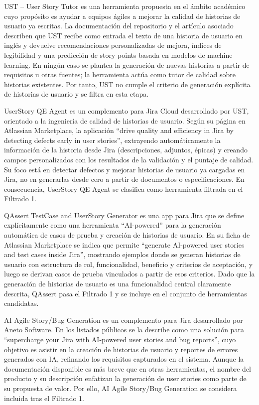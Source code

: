 UST – User Story Tutor \cite{ust} es una herramienta propuesta en el ámbito académico cuyo propósito es ayudar a equipos ágiles a mejorar la calidad de historias de usuario ya escritas. La documentación del repositorio y el artículo asociado describen que UST recibe como entrada el texto de una historia de usuario en inglés y devuelve recomendaciones personalizadas de mejora, índices de legibilidad y una predicción de story points basada en modelos de machine learning. En ningún caso se plantea la generación de nuevas historias a partir de requisitos u otras fuentes; la herramienta actúa como tutor de calidad sobre historias existentes. Por tanto, UST no cumple el criterio de generación explícita de historias de usuario y se filtra en esta etapa.

UserStory QE Agent \cite{userstoryqe} es un complemento para Jira Cloud desarrollado por UST, orientado a la ingeniería de calidad de historias de usuario. Según su página en Atlassian Marketplace, la aplicación “drive quality and efficiency in Jira by detecting defects early in user stories”, extrayendo automáticamente la información de la historia desde Jira (descripciones, adjuntos, épicas) y creando campos personalizados con los resultados de la validación y el puntaje de calidad. Su foco está en detectar defectos y mejorar historias de usuario ya cargadas en Jira, no en generarlas desde cero a partir de documentos o especificaciones. En consecuencia, UserStory QE Agent se clasifica como herramienta filtrada en el Filtrado 1.

QAssert TestCase and UserStory Generator \cite{qassert} es una app para Jira que se define explícitamente como una herramienta “AI-powered” para la generación automática de casos de prueba y creación de historias de usuario. En su ficha de Atlassian Marketplace se indica que permite “generate AI-powered user stories and test cases inside Jira”, mostrando ejemplos donde se generan historias de usuario con estructura de rol, funcionalidad, beneficio y criterios de aceptación, y luego se derivan casos de prueba vinculados a partir de esos criterios. Dado que la generación de historias de usuario es una funcionalidad central claramente descrita, QAssert pasa el Filtrado 1 y se incluye en el conjunto de herramientas candidatas.

AI Agile Story/Bug Generation \cite{aiagilestory} es un complemento para Jira desarrollado por Aneto Software. En los listados públicos se la describe como una solución para “supercharge your Jira with AI-powered user stories and bug reports”, cuyo objetivo es asistir en la creación de historias de usuario y reportes de errores generados con IA, refinando los requisitos capturados en el sistema. Aunque la documentación disponible es más breve que en otras herramientas, el nombre del producto y su descripción enfatizan la generación de user stories como parte de su propuesta de valor. Por ello, AI Agile Story/Bug Generation se considera incluida tras el Filtrado 1. 

